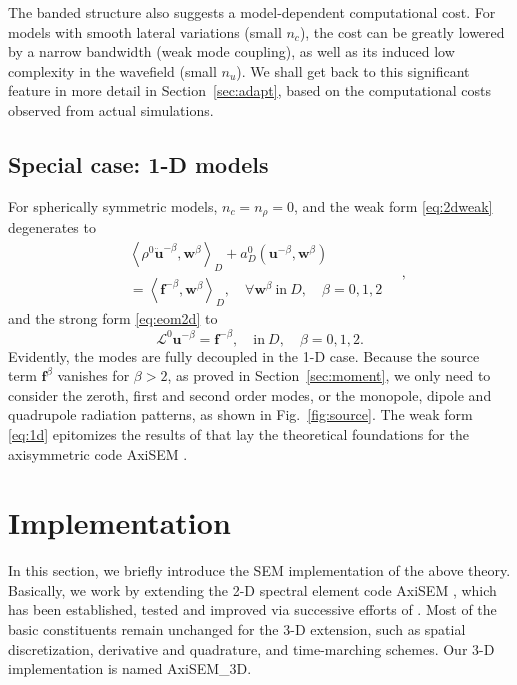\documentclass[extra,referee]{gji}
\begin{document}
The banded structure also suggests a model-dependent computational cost. 
For models with smooth lateral variations (small $n_c$),  
the cost can be greatly lowered by a narrow bandwidth (weak mode coupling),
as well as its induced low complexity in the wavefield (small $n_u$).
We shall get back to this significant feature in more detail in 
Section~\ref{sec:adapt}, based on the computational costs observed from 
actual simulations.

\subsection{Special case: 1-D models}
\label{sec:1d}
For spherically symmetric models, $n_c=n_\rho=0$, and the weak form \eqref{eq:2dweak} 
degenerates to
\begin{equation}
  \begin{alignedat}{1}
    & \left\langle \rho^{0}
    \ddot{\mathbf{u}}^{-\beta},\mathbf{w}^\beta \right\rangle _{D}
    + a_D^0
    \left(\mathbf{u}^{-\beta},\mathbf{w}^\beta\right)\\&= 
    \left\langle \mathbf{f}^{-\beta},\mathbf{w}^\beta \right\rangle _{D},\quad
    \forall \mathbf{w}^\beta\ \text{in}\ D, \quad 
    \beta=0,1,2
  \end{alignedat}\quad,
  \label{eq:1d}
\end{equation}
and the strong form \eqref{eq:eom2d} to 
\begin{equation}
  \mathscr{L}^0\mathbf{u}^{-\beta}=\mathbf{f}^{-\beta}, 
  \quad \text{in}\ D, \quad \beta=0,1,2.
\end{equation}
Evidently, the modes are fully decoupled in the 1-D case. 
Because the source term $\mathbf{f}^\beta$ vanishes for $\beta>2$,
as proved in Section~\ref{sec:moment}, we only need to consider 
the zeroth, first and second order modes, or the monopole, dipole 
and quadrupole radiation patterns, as shown in Fig.~\ref{fig:source}.
The weak form \eqref{eq:1d} epitomizes the results of 
\cite{nissen2007axisem} that lay the theoretical foundations
for the axisymmetric code AxiSEM \cite[]{nissen2014axisem}.


\section{Implementation}
\label{sec:imp}
In this section, we briefly introduce the SEM implementation of the above
theory. Basically, we work by extending the 2-D spectral element code 
AxiSEM \cite[]{nissen2014axisem}, which has been established, tested
and improved via successive efforts of \cite{nissen2007sem, nissen2008sem,
van2014seismic, van2014optimized}. 
Most of the basic constituents remain unchanged for the 3-D extension,
such as spatial discretization, derivative and quadrature, and time-marching schemes.
Our 3-D implementation is named AxiSEM\_3D. 
\end{document}
